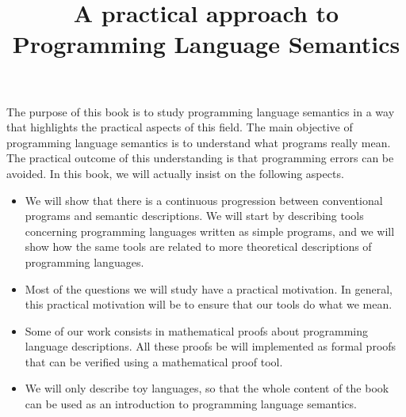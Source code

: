\documentclass{book}
\title{A practical approach to Programming Language Semantics}
\begin{document}
The purpose of this book is to study programming language semantics
in a way that highlights the practical aspects of this field.
The main objective of programming language semantics is to understand
what programs really mean.  The practical outcome of this understanding
is that programming errors can be avoided.  In this book, we will actually
insist on the following aspects.

\begin{itemize}
  \item
    We will show that there is a continuous progression between
    conventional programs and semantic descriptions.  We will start
    by describing tools concerning  programming languages written
    as simple programs, and we will show how the same tools are
    related to more theoretical descriptions of programming languages.
  \item Most of the questions we will study have a practical motivation.  In
    general, this practical motivation will be to ensure that our tools
    do what we mean.
  \item Some of our work consists in mathematical proofs about programming
    language descriptions.  All these proofs be will implemented as formal
    proofs that can be verified using a mathematical proof tool.
  \item We will only describe toy languages, so that the whole content
    of the book can be used as an introduction to programming language
    semantics.
\end{itemize}
\end{document}
